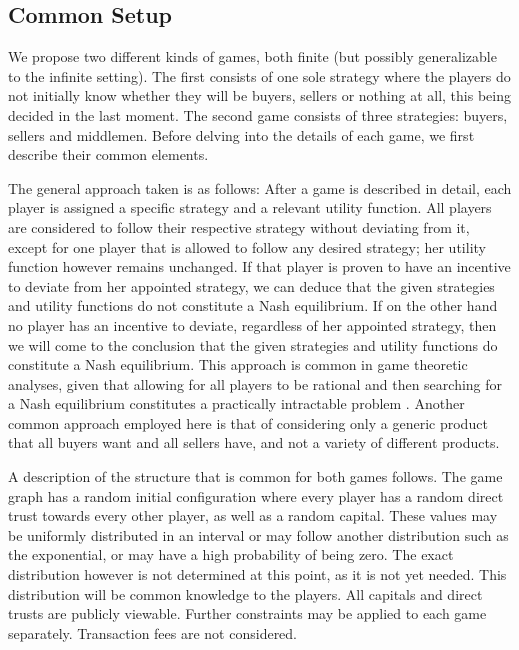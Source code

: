 \subsection{Common Setup}
  We propose two different kinds of games, both finite (but possibly generalizable to the infinite setting). The first
  consists of one sole strategy where the players do not initially know whether they will be buyers, sellers or nothing at
  all, this being decided in the last moment. The second game consists of three strategies: buyers, sellers and middlemen.
  Before delving into the details of each game, we first describe their common elements.
  
  The general approach taken is as follows: After a game is described in detail, each player is assigned a specific strategy and
  a relevant utility function. All players are considered to follow their respective strategy without deviating from it, except
  for one player that is allowed to follow any desired strategy; her utility function however remains unchanged. If that player
  is proven to have an incentive to deviate from her appointed strategy, we can deduce that the given strategies and utility
  functions do not constitute a Nash equilibrium. If on the other hand no player has an incentive to deviate, regardless of
  her appointed strategy, then we will come to the conclusion that the given strategies and utility functions do constitute a
  Nash equilibrium. This approach is common in game theoretic analyses, given that allowing for all players to be rational and
  then searching for a Nash equilibrium constitutes a practically intractable problem \cite{daskalakis}. Another common
  approach employed here is that of considering only a generic product that all buyers want and all sellers have, and not a
  variety of different products.

  A description of the structure that is common for both games follows. The game graph has a random initial configuration
  where every player has a random direct trust towards every other player, as well as a random capital. These values may be
  uniformly distributed in an interval or may follow another distribution such as the exponential, or may have a high
  probability of being zero. The exact distribution however is not determined at this point, as it is not yet needed. This
  distribution will be common knowledge to the players. All capitals and direct trusts are publicly viewable. Further
  constraints may be applied to each game separately.  Transaction fees are not considered.
  
